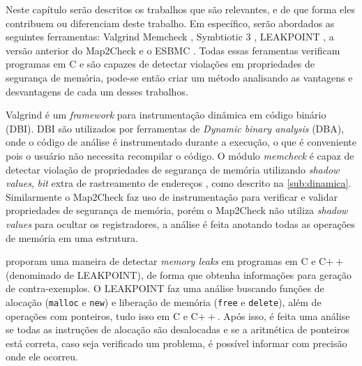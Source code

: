 \label{chapter:correlatos}

Neste capítulo serão descritos os trabalhos que são relevantes, e de que forma eles contribuem ou diferenciam deste trabalho. Em específico, serão abordados as seguintes ferramentas: Valgrind Memcheck \cite{Nethercote:2007}, Symbtiotic 3 \cite{Chalupa:2016}, LEAKPOINT \cite{Clause:2010}, a versão anterior do Map2Check \cite{Rocha:2015} e o ESBMC \cite{Cordeiro:2012}. Todas essas feramentas verificam programas em C e são capazes de detectar violações em propriedades de segurança de memória, pode-se então criar um método analisando as vantagens e desvantagens de cada um desses trabalhos. 

\par
Valgrind é um \textit{framework} para instrumentação dinâmica em código binário (DBI). DBI são utilizados por ferramentas de \textit{Dynamic binary analysis} (DBA), onde o código de análise é instrumentado durante a execução, o que é conveniente pois o usuário não necessita recompilar o código. O módulo \textit{memcheck} é capaz de detectar violação de propriedades de segurança de memória utilizando \textit{shadow values}, \textit{bit} extra de rastreamento de endereços \cite{Nethercote:2007}, como descrito na \autoref{sub:dinamica}. Similarmente o Map2Check faz uso de instrumentação para verificar e validar propriedades de segurança de memória, porém o Map2Check não utiliza \textit{shadow values} para ocultar os registradores, a análise é feita anotando todas as operações de memória em uma estrutura. 

\par
{} proporam uma maneira de detectar \textit{memory leaks} em programas em C e C$++$ (denominado de LEAKPOINT), de forma que obtenha informações para geração de contra-exemplos. O LEAKPOINT faz uma análise buscando funções de alocação (\texttt{malloc} e \texttt{new}) e liberação de memória (\texttt{free} e \texttt{delete}), além de operações com ponteiros, tudo isso em C e C$++$. Após isso, é feita uma análise se todas as instruções de alocação são desalocadas e se a aritmética de ponteiros está correta, caso seja verificado um problema, é possível informar com precisão onde ele ocorreu.

